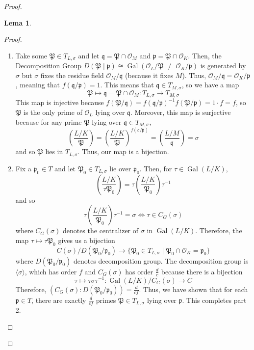 \documentclass{article}
\DeclareMathOperator{\Gal}{Gal}
\theoremstyle{plain}
\newtheorem{lemma}[thm]{Lema}
\theoremstyle{definition}
\theoremstyle{remark}
\numberwithin{equation}{section}
\numberwithin{thm}{section}
\begin{document}
\begin{proof}
\begin{lemma}
\end{lemma}

\begin{proof}

$ $ \\ \vspace{-0.4cm}



\begin{enumerate}
    \item Take some $\mathfrak{P} \in T_{L, \sigma}$ and let $\mathfrak{q} = \mathfrak{P} \cap \mathcal{O}_M$ and $\mathfrak{p} = \mathfrak{P} \cap \mathcal{O}_K$. Then, the Decomposition Group $D(\mathfrak{P}\mid\mathfrak{p}) \cong \Gal(\mathcal{O}_L/\mathfrak{P} \text{ } / \text{ } \mathcal{O}_K/\mathfrak{p})$ is generated by $\sigma$ but $\sigma$ fixes the residue field $\mathcal{O}_M/\mathfrak{q}$ (because it fixes $M$). Thus, $\mathcal{O}_M/\mathfrak{q} = \mathcal{O}_K/\mathfrak{p}$, meaning that $f(\mathfrak{q}/\mathfrak{p}) = 1$. This means that $\mathfrak{q} \in T_{M, \sigma}$, so we have a map $$\mathfrak{P} \mapsto \mathfrak{q} = \mathfrak{P} \cap \mathcal{O}_M : T_{L, \sigma} \to T_{M, \sigma}$$ This map is injective because $f(\mathfrak{P}/\mathfrak{q}) = f(\mathfrak{q}/\mathfrak{p})^{-1}f(\mathfrak{P}/\mathfrak{p}) = 1 \cdot f = f$, so $\mathfrak{P}$ is the only prime of $\mathcal{O}_L$ lying over $\mathfrak{q}$. Moreover, this map is surjective because for any prime $\mathfrak{P}$ lying over $\mathfrak{q} \in T_{M, \sigma}$, $$\left(\frac{L/K}{\mathfrak{P}}\right) = \left(\frac{L/K}{\mathfrak{P}}\right)^{f(\mathfrak{q}/\mathfrak{p})} = \left(\frac{L/M}{\mathfrak{q}}\right) = \sigma$$ and so $\mathfrak{P}$ lies in $T_{L, \sigma}$. Thus, our map is a bijection.

    \item Fix a $\mathfrak{p}_{0} \in T$ and let $\mathfrak{P}_{0} \in T_{L, \sigma}$ lie over $\mathfrak{p}_{0}$. Then, for $\tau \in \Gal(L/K)$, $$\left(\frac{L/K}{\tau\mathfrak{P}_{0}}\right) = \tau\left(\frac{L/K}{\mathfrak{P}_{0}}\right)\tau^{-1}$$ and so $$\tau\left(\frac{L/K}{\mathfrak{P}_{0}}\right)\tau^{-1} = \sigma \Longleftrightarrow \tau \in C_{G}(\sigma)$$ where $C_{G}(\sigma)$ denotes the centralizer of $\sigma$ in $\Gal(L/K)$. Therefore, the map $\tau \mapsto \tau\mathfrak{P}_{0}$ gives us a bijection $$C(\sigma)/D(\mathfrak{P}_{0}/\mathfrak{p}_{0}) \longrightarrow \{\mathfrak{P}_{0} \in T_{L, \sigma} \mid \mathfrak{P}_{0} \cap \mathcal{O}_K = \mathfrak{p}_{0}\}$$ where $D(\mathfrak{P}_{0}/\mathfrak{p}_{0})$ denotes decomposition group. The decomposition group is $\langle\sigma\rangle$, which has order $f$ and $C_{G}(\sigma)$ has order $\frac{d}{c}$ because there is a bijection $$\tau \mapsto \tau\sigma\tau^{-1} : \Gal(L/K) / C_{G}(\sigma) \to C$$ Therefore, $(C_{G}(\sigma) : D(\mathfrak{P}_{0}/\mathfrak{p}_{0})) = \frac{d}{cf}$. Thus, we have shown that for each $\mathfrak{p} \in T$, there are exactly $\frac{d}{cf}$ primes $\mathfrak{P} \in T_{L, \sigma}$ lying over $\mathfrak{p}$. This completes part 2.  


\end{enumerate}
\end{proof}
\end{proof}
\end{document}
